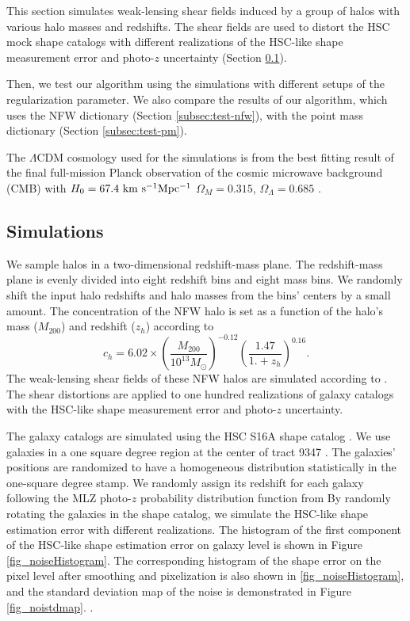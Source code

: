 \documentclass[twocolumn]{aastex62}
\begin{document}
This section simulates weak-lensing shear fields induced by a group of halos
with various halo masses and redshifts. The shear fields are used to distort
the HSC mock shape catalogs with different realizations of the HSC-like shape
measurement error and photo-$z$ uncertainty (Section \ref{subsec:Sims}).

Then, we test our algorithm using the simulations with different setups of the
regularization parameter. We also compare the results of our algorithm, which
uses the NFW dictionary (Section \ref{subsec:test-nfw}), with the point mass
dictionary (Section \ref{subsec:test-pm}).

The $\Lambda$CDM cosmology used for the simulations is from the best fitting
result of the final full-mission Planck observation of the cosmic microwave
background (CMB) with $H_0=67.4 ~\rm{km~s^{-1} Mpc^{-1}}$ $\Omega_M=0.315$,
$\Omega_\Lambda=0.685$ \citep{cmb-Planck2018-Cosmology}.

\subsection{Simulations}
\label{subsec:Sims}

We sample halos in a two-dimensional redshift-mass plane. The redshift-mass
plane is evenly divided into eight redshift bins and eight mass bins. We
randomly shift the input halo redshifts and halo masses from the bins' centers
by a small amount. The concentration of the NFW halo is set as a function of
the halo's mass ($M_{200}$) and redshift ($z_{h}$) according to
\citet{c-M_Magneticum-Ragagnin2019}
\begin{equation}
c_{h}=6.02\times(\frac{M_{200}}{10^{13} M_{\odot}})^{-0.12}(\frac{1.47}{1.+z_h})^{0.16}.
\end{equation}
The weak-lensing shear fields of these NFW halos are simulated according to
\citet{haloModel-TJ2003-3pt}. The shear distortions are applied to one hundred
realizations of galaxy catalogs with the HSC-like shape measurement error and
photo-$z$ uncertainty.

The galaxy catalogs are simulated using the HSC S16A shape catalog
\citep{HSC1-catalog}.  We use galaxies in a one square degree region at the
center of tract 9347 \citep{HSC1-data}.  The galaxies' positions are randomized
to have a homogeneous distribution statistically in the one-square
degree stamp. We randomly assign its redshift for each galaxy following the
MLZ photo-$z$ probability distribution function from By randomly rotating the
galaxies in the shape catalog, we simulate the HSC-like shape estimation error
with different realizations.  The histogram of the first component of the
HSC-like shape estimation error on galaxy level is shown in Figure
\ref{fig_noiseHistogram}.  The corresponding histogram of the shape error on
the pixel level after smoothing and pixelization is also shown in
\ref{fig_noiseHistogram}, and the standard deviation map of the noise is
demonstrated in Figure \ref{fig_noistdmap}.  \citep{HSC1-photoz}.
\end{document}
